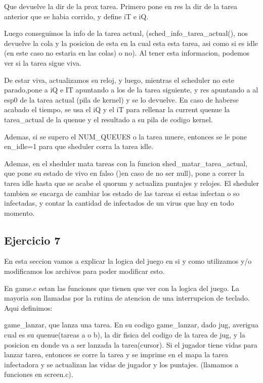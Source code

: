 \documentclass[a4paper]{article}
\begin{document}
Que devuelve la dir de la prox tarea. Primero pone en res la dir de la tarea anterior que se habia corrido, y define iT e iQ.

Luego conseguimos la info de la tarea actual, (sched_info_tarea_actual(), nos devuelve la cola y la posicion de esta en la cual esta esta tarea, asi como si es idle (en este caso no estaria en las colas) o no). Al tener esta informacion, podemos ver si la tarea sigue viva.

De estar viva, actualizamos su reloj, y luego, mientras el scheduler no este parado,pone a iQ  e IT apuntando a los de la tarea siguiente, y res apuntando a al esp0 de la tarea actual (pila de kernel) y se lo devuelve. En caso de haberse acabado el tiempo, se usa el iQ y el iT para rellenar la current quenue la tarea_actual de la quenue y el resultado a su pila de codigo kernel.

Ademas, si se supero el NUM_QUEUES o la tarea muere, entonces se le pone en_idle=1 para que sheduler corra la tarea idle.
 
Ademas, en el sheduler mata tareas con la funcion shed_matar_tarea_actual, que pone su estado de vivo en falso ()en caso de no ser null), pone a correr la tarea idle hasta que se acabe el quorum y actualiza puntajes y relojes. 
El sheduler tambien se encarga de cambiar los estado de las tareas si estas infectan o so infectadas, y contar la cantidad de infectados de un virus que hay en todo momento.
   

\subsection{Ejercicio 7}


En esta seccion vamos a explicar la logica del juego en si y como utilizamos y/o modificamos los archivos para poder modificar esto.

En game.c estan las funciones que tienen que ver con la logica del juego. La mayoria son llamadas por la rutina de atencion de una interrupcion de teclado. Aqui definimos:

game_lanzar, que lanza una tarea. En su codigo game_lanzar, dado jug, averigua cual es su quenue(tareas a o b), la dir fisica del codigo de la tarea de jug, y la posicion en donde va a ser lanzada la tarea(cursor).
Si el jugador tiene vidas para lanzar tarea, entonces se corre la tarea y se imprime en el mapa la tarea infectadora y se actualizan las vidas de jugador y los puntajes. (llamamos a funciones en screen.c).
\end{document}
